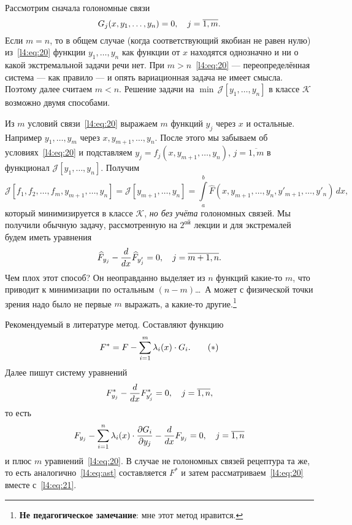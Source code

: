 \documentclass[12pt,a4paper,openany,fleqn]{book}
\newcommand{\J}{\ensuremath{\mathcal{J}}}
\newcommand{\mc}[1]{\ensuremath{\mathcal{#1}}}
\newcommand{\der}[2]{\ensuremath{\frac{d#1}{d#2}}}
\newcommand{\pder}[2]{\ensuremath{\frac{\partial#1}{\partial#2}}}
\newcommand{\K}{\mc{K}}
\theoremstyle{definition}
\begin{document}
\begin{enumerateD}
Рассмотрим сначала голономные связи
\begin{equation}
	\label{l4:eq:20}
	\hfill G_j(x,y_1,\ldots,y_n)=0,\quad j=\overline{1,m}.\hfill
\end{equation}
Если $m=n$, то в общем случае (когда соответствующий якобиан не равен нулю) из~\eqref{l4:eq:20} функции $y_1,\ldots,y_n$ как функции от $x$ находятся однозначно и ни о какой экстремальной задачи речи нет. При $m>n$~\eqref{l4:eq:20} --- переопределённая система --- как правило --- и опять вариационная задача не имеет смысла. Поэтому далее считаем $m<n$. Решение задачи на $\min\,\J[y_1,\ldots,y_n]$ в классе $\K$ возможно двумя способами. 
\begin{enumerateD}
	\item Из $m$ условий связи~\eqref{l4:eq:20} выражаем $m$ функций $y_j$ через $x$ и остальные. Например $y_1,\ldots,y_m$ через $x,y_{m+1},\ldots,y_n$. После этого мы забываем об условиях~\eqref{l4:eq:20} и подставляем $y_j=f_j(x,y_{m+1},\ldots,y_{n})$, $j=\overline{1,m}$ в функционал $\J[y_1,\ldots,y_n]$. Получим
	\begin{equation*}
		\J[f_1,f_2,\ldots,f_m,y_{m+1},\ldots,y_n]=\widehat{\J}[y_{m+1},\ldots,y_n]=\int\limits_a^b \widehat{F}(x,y_{m+1},\ldots,y_n,y'_{m+1},\ldots,y'_n)\,dx,
	\end{equation*}  
	который минимизируется в классе $\K$, \emph{но без учёта} голономных связей. Мы получили обычную задачу, рассмотренную на $2^{\text{ой}}$ лекции и для экстремалей будем иметь уравнения
	\begin{equation*}
		\hfill \widehat{F}_{y_j}-\der{}{x}\widehat{F}_{y'_j}=0,\quad j=\overline{m+1,n}.\hfill
	\end{equation*} 
	Чем плох этот способ? Он неоправданно выделяет из $n$ функций какие-то $m$, что приводит к минимизации по остальным $(n-m)$\dots\  А может с физической точки зрения надо было не первые $m$ выражать, а какие-то другие.\footnote{\textbf{Не педагогическое замечание}: мне этот метод нравится.}
	\item Рекомендуемый в литературе метод. Составляют функцию
	\begin{equation}
		\label{l4:eq:ast}
		\hfill F^{\ast}=F-\sum\limits_{i=1}^{m}\lambda_i(x)\cdot G_i.\tag{$\ast$}\hfill
	\end{equation} 
	Далее пишут систему уравнений
	\begin{equation}
		\label{l4:eq:21}
		\hfill F^{\ast}_{y_j}-\der{}{x}F^{\ast}_{y'_j}=0,\quad j=\overline{1,n},\hfill
	\end{equation}
	то есть 
	\begin{equation*}
		\hfill F_{y_j}-\sum\limits_{i=1}^n\lambda_i(x)\cdot\pder{G_i}{y_j}-\der{}{x}F_{y_j}=0,\quad j=\overline{1,n}\hfill
	\end{equation*}
	и плюс $m$ уравнений~\eqref{l4:eq:20}.
	В случае не голономных связей рецептура та же, то есть аналогично~\eqref{l4:eq:ast} составляется $	F^{\ast}$ и затем рассматриваем~\eqref{l4:eq:20} вместе с~\eqref{l4:eq:21}.
\end{enumerateD}
\end{enumerateD}
\end{document}
